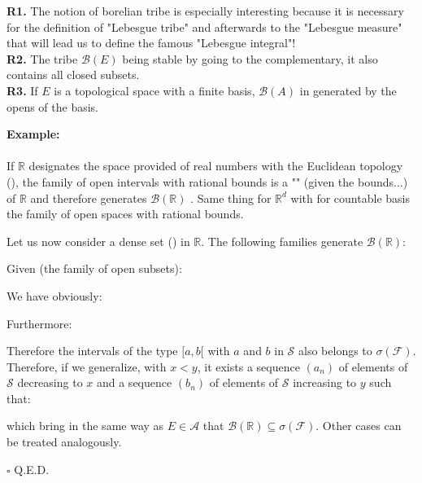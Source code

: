 	\begin{tcolorbox}[title=Remarks,colframe=black,arc=10pt]
	\textbf{R1.} The notion of borelian tribe is especially interesting because it is necessary for the definition of "Lebesgue tribe" and afterwards to the "Lebesgue measure" that will lead us to define the  famous "Lebesgue integral"!\\
	
	\textbf{R2.} The tribe $\mathcal{B}(E)$ being stable by going to the complementary, it also contains all closed subsets.\\
	
	\textbf{R3.} If $E$ is a topological space with a finite basis, $\mathcal{B}(A)$ in generated by the opens of the basis.
	\end{tcolorbox}	
	\begin{tcolorbox}[colframe=black,colback=white,sharp corners]
	\textbf{{\Large {}}Example:}\\\\
	If $\mathbb{R}$ designates the space provided of real numbers with the Euclidean topology (), the family of open intervals with rational bounds is a "" (given the bounds...) of $\mathbb{R}$ and therefore generates $\mathcal{B}(\mathbb{R})$ . Same thing for $\mathbb{R}^d$ with for countable basis the family of open spaces with rational bounds.
	\end{tcolorbox}
	\begin{theorem}
	Let us now consider a dense set () in $\mathbb{R}$. The following families generate $\mathcal{B}(\mathbb{R})$:
	
	\end{theorem}
	\begin{dem}
	Given (the family of open subsets):
	
	We have obviously:
	
	Furthermore:
	
	Therefore the intervals of the type $[a,b[$ with $a$ and $b$ in $\mathcal{S}$ also belongs to $\sigma(\mathcal{F})$. Therefore, if we generalize, with $x<y$, it exists a sequence $(a_n)$ of elements of $\mathcal{S}$ decreasing to $x$ and a sequence $(b_n)$ of elements of $\mathcal{S}$ increasing to $y$ such that:
	
	which bring in the same way as $E\in \mathcal{A}$ that $\mathcal{B}(\mathbb{R})\subseteq\sigma(\mathcal{F})$. Other cases can be treated analogously.
	\begin{flushright}
		$\square$  Q.E.D.
	\end{flushright}
	\end{dem}

